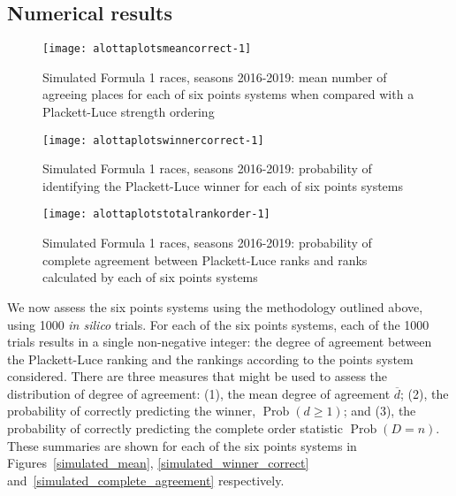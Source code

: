 \documentclass{elsarticle}
\begin{document}
\subsection{Numerical results}\label{numerical-results}

\begin{figure}
{\centering \texttt{[image: alottaplotsmeancorrect-1]}}
\caption[\doublespacing Simulated Formula 1 races, seasons
  2016-2019]{\doublespacing Simulated Formula 1 races, seasons
  2016-2019: mean number of agreeing places for each of six
  points \label{simulated_mean} systems when compared with a
  Plackett-Luce strength ordering}\label{fig:alottaplotsmeancorrect}
\end{figure}

\begin{figure}
{\centering \texttt{[image: alottaplotswinnercorrect-1]} }
\caption[\doublespacing Simulated Formula 1 races, seasons
  2016-2019]{\doublespacing Simulated Formula 1 races, seasons
  2016-2019: probability of identifying the Plackett-Luce winner for
  each of six points \label{simulated_winner_correct}
  systems}\label{fig:alottaplotswinnercorrect}
\end{figure}

\begin{figure}
{\centering \texttt{[image: alottaplotstotalrankorder-1]}}
\caption[\doublespacing Simulated Formula 1 races, seasons
  2016-2019]{\doublespacing Simulated Formula 1 races, seasons
  2016-2019: probability of complete agreement between Plackett-Luce
  ranks and ranks calculated by each of six
  points \label{simulated_complete_agreement}
  systems}\label{fig:alottaplotstotalrankorder}
\end{figure}

We now assess the six points systems using the methodology outlined
above, using 1000 \emph{in silico} trials.  For each of the six points
systems, each of the 1000 trials results in a single non-negative
integer: the degree of agreement between the Plackett-Luce ranking and
the rankings according to the points system considered.  There are
three measures that might be used to assess the distribution of degree
of agreement: (1), the mean degree of agreement \(\overline{d}\); (2),
the probability of correctly predicting the winner,
$\operatorname{Prob}(d\geq 1)$; and (3), the probability of correctly
predicting the complete order statistic $\operatorname{Prob}(D=n)$.
These summaries are shown for each of the six points systems in
Figures~\ref{simulated_mean}, \ref{simulated_winner_correct}
and~\ref{simulated_complete_agreement} respectively.
\end{document}
